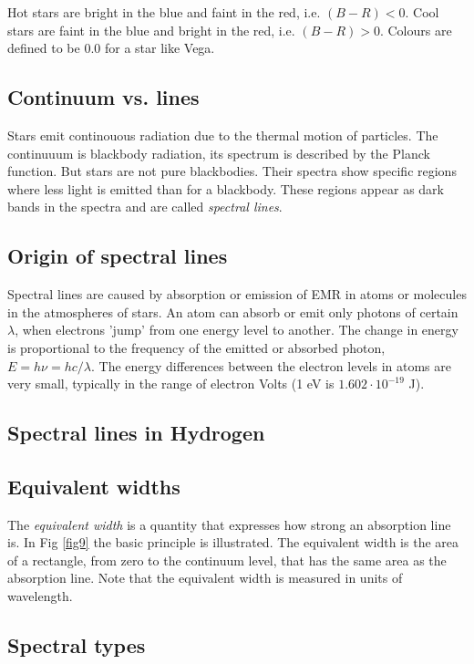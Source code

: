 Hot stars are bright in the blue and faint in the red, i.e. $(B-R)<0$. Cool stars are faint in the blue and bright in the red, i.e. $(B-R)>0$. Colours are defined to be 0.0 for a star like Vega.

\subsection{Continuum vs. lines}

Stars emit continouous radiation due to the thermal motion of particles. The continuuum is blackbody radiation, its spectrum is described by the Planck function. But stars are not pure blackbodies. Their spectra show specific regions where less light is emitted than for a blackbody. These regions appear as dark bands in the spectra and are called \textit{spectral lines}.

\subsection{Origin of spectral lines}

Spectral lines are caused by absorption or emission of EMR in atoms or molecules in the atmospheres of stars. An atom can absorb or emit only photons of certain $\lambda$, when electrons 'jump' from one energy level to another. The change in energy is proportional to the frequency of the emitted or absorbed photon, $E = h \nu = h c / \lambda$. The energy differences between the electron levels in atoms are very small, typically in the range of electron Volts (1 eV is $1.602\cdot10^{-19}$ J).

\subsection{Spectral lines in Hydrogen}

\subsection{Equivalent widths}

The \textit{equivalent width} is a quantity that expresses how strong an absorption line is. In Fig \ref{fig9} the basic principle is illustrated. The equivalent width is the area of a rectangle, from zero to the continuum level, that has the same area as the absorption line. Note that the equivalent width is measured in units of wavelength.

\subsection{Spectral types}

